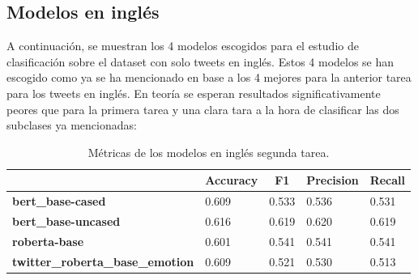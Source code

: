 \subsection{Modelos en inglés}

A continuación, se muestran los 4 modelos escogidos para el estudio de clasificación sobre el dataset con solo tweets en inglés. Estos 4 modelos se han escogido como ya se ha mencionado en base a los 4 mejores para la anterior tarea para los tweets en inglés. En teoría se esperan resultados significativamente peores que para la primera tarea y una clara tara a la hora de clasificar las dos subclases ya mencionadas:

\begin{table}[H]
\begin{tabular}{|l|l|l|l|l|}
\hline
\rowcolor[HTML]{9B9B9B} 
\multicolumn{1}{|c|}{\cellcolor[HTML]{9B9B9B}{\color[HTML]{000000} \textbf{Versión}}} 
& \multicolumn{1}{c|}{\cellcolor[HTML]{9B9B9B}\textbf{Accuracy}} 
& \multicolumn{1}{c|}{\cellcolor[HTML]{9B9B9B}\textbf{F1}}
& \multicolumn{1}{c|}{\cellcolor[HTML]{9B9B9B}\textbf{Precision}} 
& \multicolumn{1}{c|}{\cellcolor[HTML]{9B9B9B}\textbf{Recall}} 
\\ \hline
\rowcolor[HTML]{E7E6E6} 
\cellcolor[HTML]{9B9B9B}\textbf{bert\_base-cased}                                                            
& {\color[HTML]{000000} 0.609}                              
& {\color[HTML]{000000} 0.533}                         
& {\color[HTML]{000000} 0.536}                              
& {\color[HTML]{000000} 0.531}                            
\\ \hline
\rowcolor[HTML]{E7E6E6} 
\cellcolor[HTML]{9B9B9B}\textbf{bert\_base-uncased}                                                          
& {\color[HTML]{000000} 0.616}                               
& {\color[HTML]{000000} 0.619}                        
& {\color[HTML]{000000} 0.620}                              
& {\color[HTML]{000000} 0.619}                           
\\ \hline
\rowcolor[HTML]{E7E6E6} 
\cellcolor[HTML]{9B9B9B}\textbf{roberta-base}                                                               
& {\color[HTML]{000000} 0.601}                               
& {\color[HTML]{000000} 0.541}                         
& {\color[HTML]{000000} 0.541}                               
& {\color[HTML]{000000} 0.541}                            
\\ \hline
\rowcolor[HTML]{E7E6E6} 
\cellcolor[HTML]{9B9B9B}\textbf{twitter\_roberta\_base\_emotion}                                           
& {\color[HTML]{000000} 0.609}                             
& {\color[HTML]{000000} 0.521}                       
& {\color[HTML]{000000} 0.530}                               
& {\color[HTML]{000000} 0.513}                             
\\ \hline
\end{tabular}
\caption{Métricas de los modelos en inglés segunda tarea.}
\end{table}

